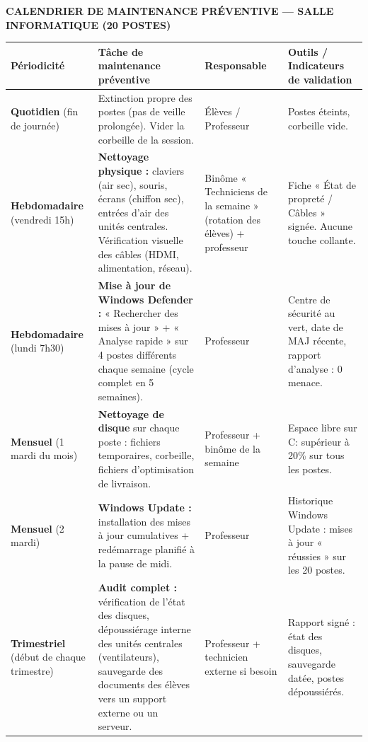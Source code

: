 \documentclass[11pt]{article}
\begin{document}
\begin{exoresolu}
\textbf{CALENDRIER DE MAINTENANCE PRÉVENTIVE — SALLE INFORMATIQUE (20 POSTES)}\par
\begin{center}
\begin{tabularx}{\linewidth}{|l|X|l|X|}
\hline
\rowcolor{popgoldL}
\textbf{Périodicité} & \textbf{Tâche de maintenance préventive} & \textbf{Responsable} & \textbf{Outils / Indicateurs de validation} \\
\hline
\textbf{Quotidien} (fin de journée) & Extinction propre des postes (pas de veille prolongée). Vider la corbeille de la session. & Élèves / Professeur & Postes éteints, corbeille vide. \\
\hline
\textbf{Hebdomadaire} (vendredi 15h) & \textbf{Nettoyage physique :} claviers (air sec), souris, écrans (chiffon sec), entrées d'air des unités centrales. Vérification visuelle des câbles (HDMI, alimentation, réseau). & Binôme « Techniciens de la semaine » (rotation des élèves) + professeur & Fiche « État de propreté / Câbles » signée. Aucune touche collante. \\
\hline
\textbf{Hebdomadaire} (lundi 7h30) & \textbf{Mise à jour de Windows Defender :} « Rechercher des mises à jour » + « Analyse rapide » sur 4 postes différents chaque semaine (cycle complet en 5 semaines). & Professeur & Centre de sécurité au vert, date de MAJ récente, rapport d'analyse : 0 menace. \\
\hline
\textbf{Mensuel} (1\up{er} mardi du mois) & \textbf{Nettoyage de disque} sur chaque poste : fichiers temporaires, corbeille, fichiers d'optimisation de livraison. & Professeur + binôme de la semaine & Espace libre sur C: supérieur à 20\% sur tous les postes. \\
\hline
\textbf{Mensuel} (2\up{e} mardi) & \textbf{Windows Update :} installation des mises à jour cumulatives + redémarrage planifié à la pause de midi. & Professeur & Historique Windows Update : mises à jour « réussies » sur les 20 postes. \\
\hline
\textbf{Trimestriel} (début de chaque trimestre) & \textbf{Audit complet :} vérification de l'état des disques, dépoussiérage interne des unités centrales (ventilateurs), sauvegarde des documents des élèves vers un support externe ou un serveur. & Professeur + technicien externe si besoin & Rapport signé : état des disques, sauvegarde datée, postes dépoussiérés. \\
\hline
\end{tabularx}
\end{center}
\end{exoresolu}
\end{document}
